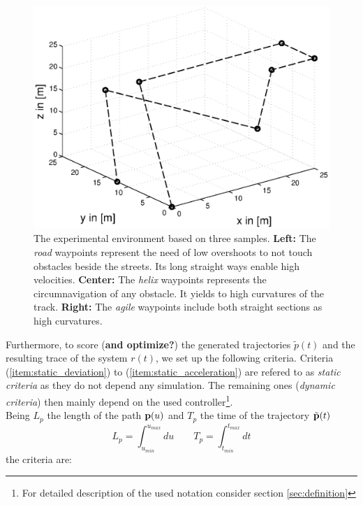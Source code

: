 \begin{figure}[h]
\begin{minipage}[t]{0.32\textwidth}
    \includegraphics[width = \textwidth]{graphics/sampleNodeAgile}
  \end{minipage}
  \caption{The experimental environment based on three samples. {\bf Left:} The \textit{road} waypoints represent the need of low overshoots to not touch obstacles beside the streets. Its long straight ways enable high velocities. {\bf Center:} The \textit{helix} waypoints represents the circumnavigation of any obstacle. It yields to high curvatures of the track. {\bf Right:} The \textit{agile} waypoints include both straight sections as high curvatures.}
  \label{fig:sampleNodes}
\end{figure}

\begin{figure}
\centering
\def\svgwidth{\columnwidth}

\end{figure}

Furthermore, to score (\textbf{and optimize?}) the generated trajectories $\tilde{p}(t)$ and the resulting trace of the system $r(t)$, we set up the following criteria. Criteria (\ref{item:static_deviation}) to (\ref{item:static_acceleration}) are refered to as \textit{static criteria} as they do not depend any simulation. The remaining ones (\textit{dynamic criteria}) then mainly depend on the used controller\footnote{For detailed description of the used notation consider section \ref{sec:definition}}.
\\
Being $L_p$ the length of the path ${\bf p}(u)$ and $T_p$ the time of the trajectory $\tilde{\bf p}(t)$
\begin{equation}
L_p = \int_{u_{min}}^{u_{max}} du \qquad T_p = \int_{t_{min}}^{t_{max}} dt
\label{eq:length_of_path}
\end{equation}
the criteria are:

